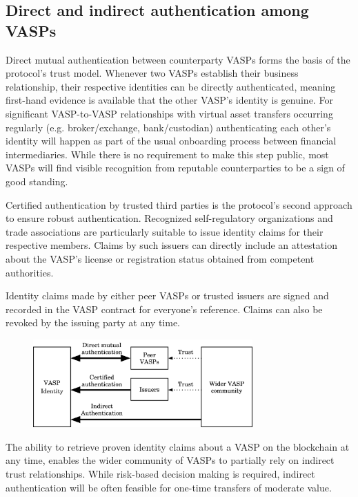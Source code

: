 \documentclass{article}
\begin{document}
\subsection{Direct and indirect authentication among VASPs}

Direct mutual authentication between counterparty VASPs forms the basis of the protocol’s trust model. Whenever two VASPs establish their business relationship, their respective identities can be directly authenticated, meaning first-hand evidence is available that the other VASP’s identity is genuine. For significant VASP-to-VASP relationships with virtual asset transfers occurring regularly (e.g. broker/exchange, bank/custodian) authenticating each other’s identity will happen as part of the usual onboarding process between financial intermediaries. While there is no requirement to make this step public, most VASPs will find visible recognition from reputable counterparties to be a sign of good standing.

Certified authentication by trusted third parties is the protocol’s second approach to ensure robust authentication. Recognized self-regulatory organizations and trade associations are particularly suitable to issue identity claims for their respective members. Claims by such issuers can directly include an attestation about the VASP’s license or registration status obtained from competent authorities.

Identity claims made by either peer VASPs or trusted issuers are signed and recorded in the VASP contract for everyone’s reference. Claims can also be revoked by the issuing party at any time.

\begin{figure}[h]
    \centering
    \includegraphics[width=0.75\textwidth]{g5.pdf}
\end{figure}

The ability to retrieve proven identity claims about a VASP on the blockchain at any time, enables the wider community of VASPs to partially rely on indirect trust relationships. While risk-based decision making is required, indirect authentication will be often feasible for one-time transfers of moderate value.
\end{document}
